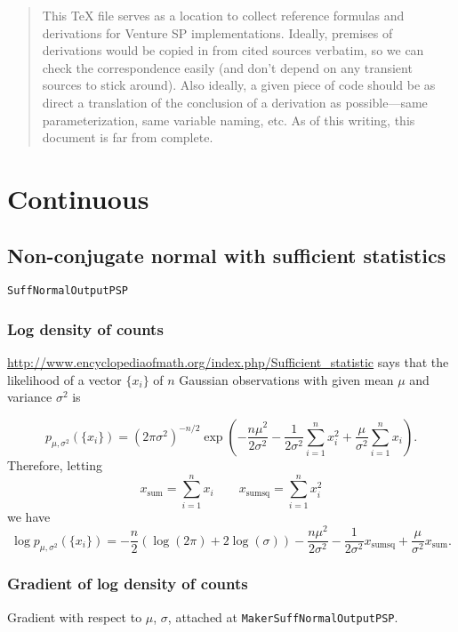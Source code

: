 \documentclass[12pt]{article}
\begin{document}
\begin{abstract}
This TeX file serves as a location to collect reference formulas and
derivations for Venture SP implementations.  Ideally, premises of
derivations would be copied in from cited sources verbatim, so we can
check the correspondence easily (and don't depend on any transient
sources to stick around).  Also ideally, a given piece of code should
be as direct a translation of the conclusion of a derivation as
possible---same parameterization, same variable naming, etc.  As of
this writing, this document is far from complete.
\end{abstract}

\section{Continuous}

\subsection{Non-conjugate normal with sufficient statistics}
\texttt{SuffNormalOutputPSP}

\subsubsection{Log density of counts}

\url{http://www.encyclopediaofmath.org/index.php/Sufficient_statistic}
says that the likelihood of a vector $\{x_i\}$ of $n$ Gaussian
observations with given mean $\mu$ and variance $\sigma^2$ is

\[ p_{\mu,\sigma^2}(\{x_i\}) = (2\pi\sigma^2)^{-n/2} \exp\left( -\frac{n \mu^2}{2 \sigma^2}
   - \frac{1}{2 \sigma^2} \sum_{i=1}^n x_i^2 + \frac{\mu}{\sigma^2}\sum_{i=1}^nx_i\right). \]
\newcommand{\xsum}{x_{\textrm{sum}}}
\newcommand{\xsumsq}{x_{\textrm{sumsq}}}
Therefore, letting
\[ \xsum = \sum_{i=1}^nx_i \qquad \xsumsq = \sum_{i=1}^n x_i^2 \]
we have
\[ \log p_{\mu,\sigma^2}(\{x_i\}) = -\frac{n}{2}(\log(2\pi) + 2\log(\sigma))
   -\frac{n \mu^2}{2 \sigma^2}
   - \frac{1}{2 \sigma^2} \xsumsq + \frac{\mu}{\sigma^2}\xsum. \]

\subsubsection{Gradient of log density of counts}

Gradient with respect to $\mu$, $\sigma$, attached at \texttt{MakerSuffNormalOutputPSP}.
\end{document}
